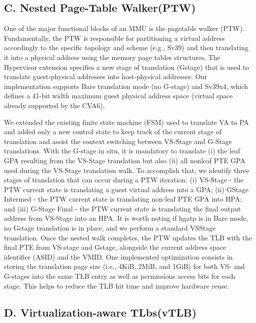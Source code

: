 \subsection*{C. Nested Page-Table Walker(PTW)}

One of the major functional blocks of an MMU is the pagetable walker (PTW). Fundamentally, the PTW is responsible
for partitioning a virtual address accordingly to the specific
topology and scheme (e.g., Sv39) and then translating it into a
physical address using the memory page tables structures. The
Hypervisor extension specifies a new stage of translation (Gstage) that is used to translate guest-physical addresses into
host-physical addresses. Our implementation supports Bare
translation mode (no G-stage) and Sv39x4, which defines a
41-bit width maximum guest physical address space (virtual
space already supported by the CVA6).

We extended the existing finite state machine (FSM) used to
translate VA to PA and added only a new control state to keep
track of the current stage of translation and assist the context
switching between VS-Stage and G-Stage translations. With
the G-stage in situ, it is mandatory to translate (i) the leaf GPA
resulting from the VS-Stage translation but also (ii) all nonleaf PTE GPA used during the VS-Stage translation walk. To
accomplish that, we identify three stages of translation that can
occur during a PTW iteration: (i) VS-Stage - the PTW current
state is translating a guest virtual address into a GPA; (ii) GStage Intermed - the PTW current state is translating non-leaf
PTE GPA into HPA; and (iii) G-Stage Final - the PTW current
state is translating the final output address from VS-Stage into
an HPA. It is worth noting if hgatp is in Bare mode, no Gstage translation is in place, and we perform a standard VSStage translation. Once the nested walk completes, the PTW
updates the TLB with the final PTE from VS-stage and Gstage, alongside the current address space identifier (ASID)
and the VMID. One implemented optimization consists in
storing the translation page size (i.e., 4KiB, 2MiB, and 1GiB)
for both VS- and G-stages into the same TLB entry as well
as permissions access bits for each stage. This helps to reduce
the TLB hit time and improve hardware reuse.

\subsection*{D. Virtualization-aware TLbs(vTLB)}

